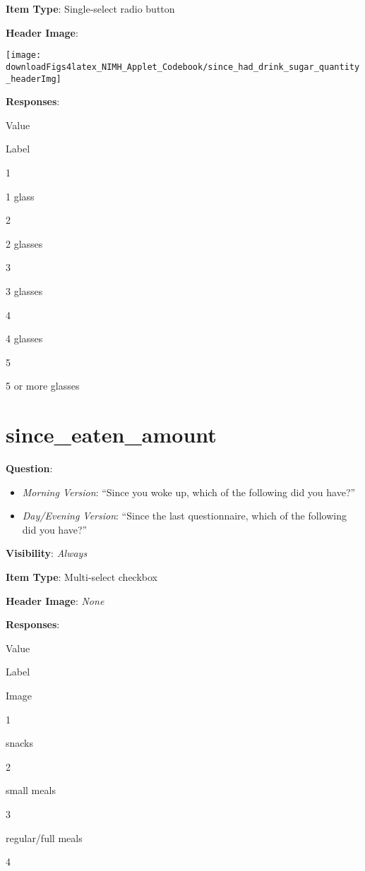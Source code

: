 \documentclass[]{book}
\providecommand{\tightlist}{%
  \setlength{\itemsep}{0pt}\setlength{\parskip}{0pt}}
\begin{document}
\textbf{Item Type}: Single-select radio button

\textbf{Header Image}:

\begin{flushleft}\texttt{[image: downloadFigs4latex\_NIMH\_Applet\_Codebook/since\_had\_drink\_sugar\_quantity\_headerImg]} \end{flushleft}

\textbf{Responses}:

Value

Label

1

1 glass

2

2 glasses

3

3 glasses

4

4 glasses

5

5 or more glasses

\hypertarget{since_eaten_amount}{%
\section{since\_eaten\_amount}\label{since_eaten_amount}}

\textbf{Question}:

\begin{itemize}
\tightlist
\item
  \emph{Morning Version}: ``Since you woke up, which of the following did you have?''
\item
  \emph{Day/Evening Version}: ``Since the last questionnaire, which of the following did you have?''
\end{itemize}

\textbf{Visibility}: \emph{Always}

\textbf{Item Type}: Multi-select checkbox

\textbf{Header Image}: \emph{None}

\textbf{Responses}:

Value

Label

Image

1

snacks

2

small meals

3

regular/full meals

4
\end{document}
